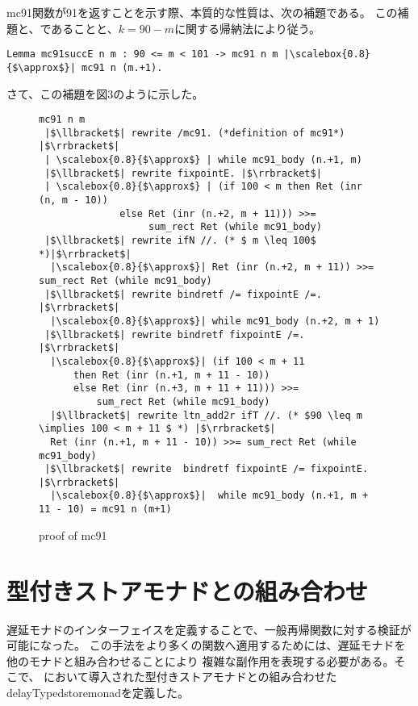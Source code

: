 \documentclass[japanese]{jssst_ppl}
\theoremstyle{definition}
\def\coqin#1{\text{\texttt{#1}}}
\begin{document}
mc91関数が91を返すことを示す際、本質的な性質は、次の補題\coqin{mc91succE}である。
この補題と、\coqin{mc91 n 101 |$\approx$| Ret 91}であることと、$ k =  90 - m $に関する帰納法により従う。

\begin{verbatim}
Lemma mc91succE n m : 90 <= m < 101 -> mc91 n m |\scalebox{0.8}{$\approx$}| mc91 n (m.+1).
\end{verbatim}

さて、この補題を図3のように示した。

\begin{figure}[H]
  \centering
  \begin{verbatim}
mc91 n m
 |$\llbracket$| rewrite /mc91. (*definition of mc91*) |$\rrbracket$|
 | \scalebox{0.8}{$\approx$} | while mc91_body (n.+1, m)
 |$\llbracket$| rewrite fixpointE. |$\rrbracket$|
 | \scalebox{0.8}{$\approx$} | (if 100 < m then Ret (inr (n, m - 10))
              else Ret (inr (n.+2, m + 11))) >>=
                   sum_rect Ret (while mc91_body)
 |$\llbracket$| rewrite ifN //. (* $ m \leq 100$ *)|$\rrbracket$|
  |\scalebox{0.8}{$\approx$}| Ret (inr (n.+2, m + 11)) >>= sum_rect Ret (while mc91_body)
 |$\llbracket$| rewrite bindretf /= fixpointE /=. |$\rrbracket$|
  |\scalebox{0.8}{$\approx$}| while mc91_body (n.+2, m + 1)
 |$\llbracket$| rewrite bindretf fixpointE /=. |$\rrbracket$|
  |\scalebox{0.8}{$\approx$}| (if 100 < m + 11
      then Ret (inr (n.+1, m + 11 - 10))
      else Ret (inr (n.+3, m + 11 + 11))) >>=
          sum_rect Ret (while mc91_body)
  |$\llbracket$| rewrite ltn_add2r ifT //. (* $90 \leq m \implies 100 < m + 11 $ *) |$\rrbracket$|
  Ret (inr (n.+1, m + 11 - 10)) >>= sum_rect Ret (while mc91_body)
 |$\llbracket$| rewrite  bindretf fixpointE /= fixpointE. |$\rrbracket$|
  |\scalebox{0.8}{$\approx$}|  while mc91_body (n.+1, m + 11 - 10) = mc91 n (m+1)
    \end{verbatim}
  \caption{proof of mc91 }
\end{figure}

\section{型付きストアモナドとの組み合わせ}

遅延モナドのインターフェイスを定義することで、一般再帰関数に対する検証が可能になった。
この手法をより多くの関数へ適用するためには、遅延モナドを他のモナドと組み合わせることにより
複雑な副作用を表現する必要がある。そこで、\cite{practicalformalizationmonadicequational}
において導入された型付きストアモナドとの組み合わせたdelayTypedstoremonadを定義した。
\end{document}
